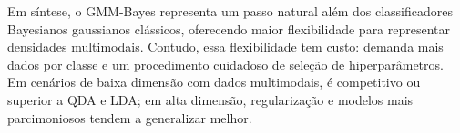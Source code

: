 Em síntese, o GMM-Bayes representa um passo natural além dos classificadores Bayesianos
gaussianos clássicos, oferecendo maior flexibilidade para representar densidades multimodais.
Contudo, essa flexibilidade tem custo: demanda mais dados por classe e um procedimento
cuidadoso de seleção de hiperparâmetros. Em cenários de baixa dimensão com dados multimodais,
é competitivo ou superior a QDA e LDA; em alta dimensão, regularização e modelos mais
parcimoniosos tendem a generalizar melhor.
